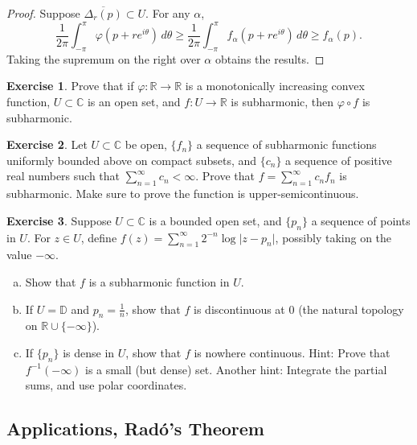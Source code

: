 \documentclass[12pt,openany]{book}
\newcommand{\sabs}[1]{\lvert {#1} \rvert}
\newcommand{\C}{{\mathbb{C}}}
\newcommand{\R}{{\mathbb{R}}}
\newcommand{\D}{{\mathbb{D}}}
\theoremstyle{plain}
\theoremstyle{remark}
\theoremstyle{definition}
\newenvironment{exbox}{%
    \def\FrameCommand{\vrule width 1pt \relax\hspace {10pt}}%
    \MakeFramed {\advance \hsize -\width \FrameRestore }%
}{%
    \endMakeFramed
}
\newenvironment{exparts}{%
    \leavevmode\begin{enumerate}[a),noitemsep,topsep=0pt,parsep=0pt,partopsep=0pt]
}{%
    \end{enumerate}
}
\theoremstyle{exercise}
\newtheorem{exercise}{Exercise}[section]
\theoremstyle{example}
\begin{document}
\begin{proof}
Suppose $\overline{\Delta_r(p)} \subset U$.  For any $\alpha$,
\begin{equation*}
\frac{1}{2\pi} \int_{-\pi}^{\pi} \varphi (p+re^{i\theta})\, d\theta 
\geq
\frac{1}{2\pi} \int_{-\pi}^{\pi} f_\alpha (p+re^{i\theta})\, d\theta 
\geq f_\alpha(p) .
\end{equation*}
Taking the supremum on the right over $\alpha$ obtains the results.
\end{proof}

\begin{exbox}
\begin{exercise}
Prove that if $\varphi \colon \R \to \R$ is a monotonically increasing
convex function, $U \subset \C$ is an open set, and $f \colon U \to \R$
is subharmonic, then $\varphi \circ f$ is subharmonic.
\end{exercise}

\begin{exercise}
Let $U \subset \C$ be open, $\{ f_n \}$ a sequence of 
subharmonic functions uniformly bounded above on compact subsets, and 
$\{ c_n \}$ a sequence of positive real numbers such that
$\sum_{n=1}^\infty c_n < \infty$.
Prove that $f = \sum_{n=1}^\infty c_n f_n$ is subharmonic.  Make sure to prove
the function is upper-semicontinuous.
\end{exercise}

\begin{exercise}
\pagebreak[2]
Suppose $U \subset \C$ is a bounded open set, and $\{ p_n \}$ a sequence of points in
$U$. For $z \in U$, define
$f(z) = \sum_{n=1}^\infty 2^{-n} \log \sabs{z-p_n}$, possibly taking on the
value $-\infty$.
\begin{exparts}
\item
Show that $f$ is a subharmonic function in $U$.
\item
If $U = \D$ and $p_n = \frac{1}{n}$, show that $f$ is discontinuous at 0
(the natural topology on $\R \cup \{ -\infty \}$).
\item
If $\{ p_n \}$ is dense in $U$, show that $f$ 
is nowhere continuous.
Hint: Prove that $f^{-1}(-\infty)$ is a small (but dense) set.  Another
hint: Integrate the partial sums, and use polar coordinates.
\pagebreak[2]
\end{exparts}
\end{exercise}
\end{exbox}

\subsection{Applications, Rad\'o's Theorem}
\end{document}
